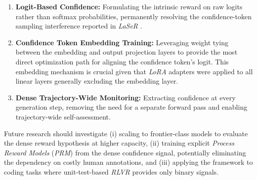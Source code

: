 \documentclass[a4paper,oneside,10pt,ngerman,english]{scrartcl}
\begin{document}
\begin{enumerate}
	\item \textbf{Logit-Based Confidence:} Formulating the intrinsic reward on raw logits rather than softmax probabilities, permanently resolving the confidence-token sampling interference reported in \textit{LaSeR} \citep{laser}.
	\item \textbf{Confidence Token Embedding Training:} Leveraging weight tying between the embedding and output projection layers to provide the most direct optimization path for aligning the confidence token's logit. This embedding mechanism is crucial given that \textit{LoRA} adapters were applied to all linear layers generally excluding the embedding layer.
	\item \textbf{Dense Trajectory-Wide Monitoring:} Extracting confidence at every generation step, removing the need for a separate forward pass and enabling trajectory-wide self-assessment.
\end{enumerate}

Future research should investigate (i) scaling to frontier-class models to evaluate the dense reward hypothesis at higher capacity, (ii) training explicit \textit{Process Reward Models} (\textit{PRM}) \citep{verifystepbystep} from the dense confidence signal, potentially eliminating the dependency on costly human annotations, and (iii) applying the framework to coding tasks where unit-test-based \textit{RLVR} provides only binary signals.


\cleardoubleoddpage





\appendix
\clearpage
\end{document}
